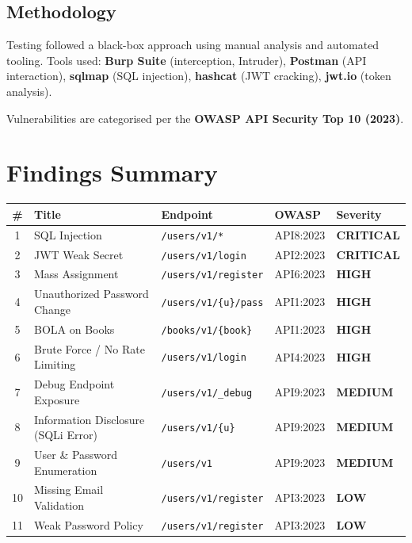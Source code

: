 \documentclass[11pt,a4paper]{article}
\newcommand{\critical}[1]{\colorbox{critred}{\color{white}\textbf{\footnotesize #1}}}
\newcommand{\high}[1]   {\colorbox{highorg}{\color{white}\textbf{\footnotesize #1}}}
\newcommand{\medium}[1] {\colorbox{medyel} {\color{white}\textbf{\footnotesize #1}}}
\newcommand{\low}[1]    {\colorbox{lowblue}{\color{white}\textbf{\footnotesize #1}}}
\begin{document}
\subsection{Methodology}

Testing followed a black-box approach using manual analysis and automated tooling. Tools used: \textbf{Burp Suite} (interception, Intruder), \textbf{Postman} (API interaction), \textbf{sqlmap} (SQL injection), \textbf{hashcat} (JWT cracking), \textbf{jwt.io} (token analysis).

Vulnerabilities are categorised per the \textbf{OWASP API Security Top 10 (2023)}.

\section{Findings Summary}

\begin{center}
\begin{tabularx}{\textwidth}{clXll}
  \toprule
  \textbf{\#} & \textbf{Title} & \textbf{Endpoint} & \textbf{OWASP} & \textbf{Severity} \\
  \midrule
  1 & SQL Injection           & \texttt{/users/v1/*}         & API8:2023 & \critical{CRITICAL} \\
  2 & JWT Weak Secret         & \texttt{/users/v1/login}     & API2:2023 & \critical{CRITICAL} \\
  3 & Mass Assignment         & \texttt{/users/v1/register}  & API6:2023 & \high{HIGH} \\
  4 & Unauthorized Password Change & \texttt{/users/v1/\{u\}/pass} & API1:2023 & \high{HIGH} \\
  5 & BOLA on Books           & \texttt{/books/v1/\{book\}}  & API1:2023 & \high{HIGH} \\
  6 & Brute Force / No Rate Limiting & \texttt{/users/v1/login} & API4:2023 & \high{HIGH} \\
  7 & Debug Endpoint Exposure & \texttt{/users/v1/\_debug}   & API9:2023 & \medium{MEDIUM} \\
  8 & Information Disclosure (SQLi Error) & \texttt{/users/v1/\{u\}} & API9:2023 & \medium{MEDIUM} \\
  9 & User \& Password Enumeration & \texttt{/users/v1}      & API9:2023 & \medium{MEDIUM} \\
  10 & Missing Email Validation & \texttt{/users/v1/register} & API3:2023 & \low{LOW} \\
  11 & Weak Password Policy    & \texttt{/users/v1/register}  & API3:2023 & \low{LOW} \\
  \bottomrule
\end{tabularx}
\end{center}
\end{document}
